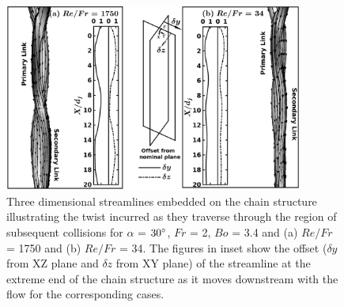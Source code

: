 \begin{figure}
    \centering
    \includegraphics[width=0.875\textwidth]{chapters/jetJet/Figure7}
    \caption{Three dimensional streamlines embedded on the chain structure illustrating the twist incurred as they traverse through the region of subsequent collisions for $\alpha$ = $30\degree$, $Fr$ = 2, $Bo$ = 3.4 and (a) $Re/Fr$ = 1750 and (b) $Re/Fr$ = 34. The figures in inset show the offset ($\delta y$ from XZ plane and $\delta z$ from XY plane) of the streamline at the extreme end of the chain structure as it moves downstream with the flow for the corresponding cases.}
    \label{Figure::stream3D}
\end{figure}
